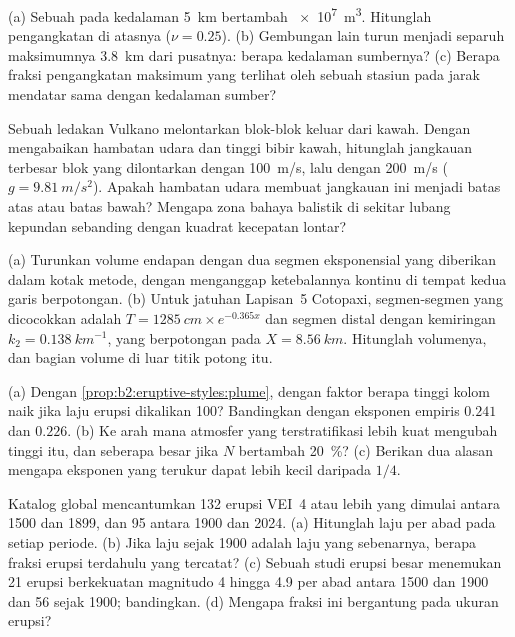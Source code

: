 \begin{exercise}[$\star\star$]\label{exo:b2:eruptive-styles:8}
(a) Sebuah  pada kedalaman \qty{5}{km} bertambah \qty{e7}{m^3}. Hitunglah
pengangkatan di atasnya ($\nu = 0.25$). (b) Gembungan lain turun menjadi separuh maksimumnya
\qty{3.8}{km} dari pusatnya: berapa kedalaman sumbernya? (c) Berapa fraksi
pengangkatan maksimum yang terlihat oleh sebuah stasiun pada jarak mendatar sama dengan kedalaman
sumber?
\end{exercise}

\begin{exercise}[$\star\star$]\label{exo:b2:eruptive-styles:9}
Sebuah ledakan Vulkano melontarkan blok-blok keluar dari kawah. Dengan mengabaikan hambatan udara
dan tinggi bibir kawah, hitunglah jangkauan terbesar blok yang dilontarkan
dengan \qty{100}{m/s}, lalu dengan \qty{200}{m/s} ($g = \qty{9.81}{m/s^2}$). Apakah hambatan
udara membuat jangkauan ini menjadi batas atas atau batas bawah? Mengapa zona bahaya
balistik di sekitar lubang kepundan sebanding dengan kuadrat kecepatan lontar?
\end{exercise}

\begin{exercise}[$\star\star\star$]\label{exo:b2:eruptive-styles:10}
(a) Turunkan volume endapan dengan dua segmen eksponensial yang diberikan dalam
kotak metode, dengan menganggap ketebalannya kontinu di tempat kedua garis berpotongan. (b) Untuk
jatuhan Lapisan~5 Cotopaxi, segmen-segmen yang dicocokkan adalah $T = \qty{1285}{cm}\times
e^{-0.365x}$ dan segmen distal dengan kemiringan $k_2 = \qty{0.138}{km^{-1}}$, yang berpotongan pada
$X = \qty{8.56}{km}$. Hitunglah volumenya, dan bagian volume di luar titik
potong itu.
\end{exercise}

\begin{exercise}[$\star\star\star$]\label{exo:b2:eruptive-styles:11}
(a) Dengan \cref{prop:b2:eruptive-styles:plume}, dengan faktor berapa tinggi
kolom naik jika laju erupsi dikalikan 100? Bandingkan dengan
eksponen empiris $0.241$ dan $0.226$. (b) Ke arah mana atmosfer yang terstratifikasi
lebih kuat mengubah tinggi itu, dan seberapa besar jika $N$ bertambah
\qty{20}{\percent}? (c) Berikan dua alasan mengapa eksponen yang terukur dapat lebih kecil daripada
$1/4$.
\end{exercise}

\begin{exercise}[$\star\star\star$]\label{exo:b2:eruptive-styles:12}
Katalog global mencantumkan 132 erupsi VEI~4 atau lebih yang dimulai antara 1500
dan 1899, dan 95 antara 1900 dan 2024. (a) Hitunglah laju per abad pada setiap
periode. (b) Jika laju sejak 1900 adalah laju yang sebenarnya, berapa fraksi erupsi
terdahulu yang tercatat? (c) Sebuah studi erupsi besar menemukan 21 erupsi berkekuatan
magnitudo 4 hingga 4.9 per abad antara 1500 dan 1900 dan 56 sejak 1900; bandingkan.
(d) Mengapa fraksi ini bergantung pada ukuran erupsi?
\end{exercise}

